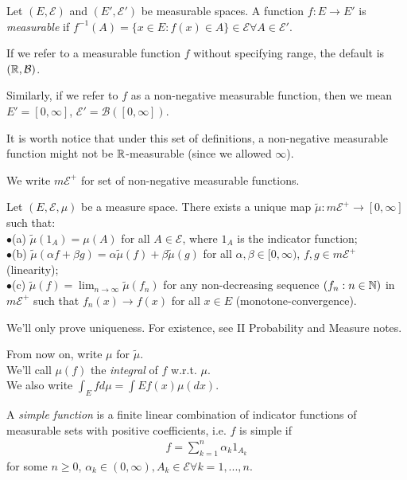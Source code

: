 \documentclass[a4paper]{article}
\begin{document}
Let $(E,\mathcal{E})$ and $(E',\mathcal{E}')$ be measurable spaces. A function $f:E \to E'$ is \emph{measurable} if $f^{-1}(A) = \{x \in E: f(x) \in A\} \in \mathcal{E} \forall A \in \mathcal{E}'$.

If we refer to a measurable function $f$ without specifying range, the default is $(\mathbb{R},\mathcal{B})$.

Similarly, if we refer to $f$ as a non-negative measurable function, then we mean $E'=[0,\infty]$, $\mathcal{E}' = \mathcal{B}([0,\infty])$.

It is worth notice that under this set of definitions, a non-negative measurable function might not be $\mathbb{R}$-measurable (since we allowed $\infty$).

We write $m\mathcal{E}^+$ for set of non-negative measurable functions.

\begin{thm}
Let $(E,\mathcal{E},\mu)$ be a measure space. There exists a unique map $\tilde{\mu}: m\mathcal{E}^+ \to [0,\infty]$ such that:\\
$\bullet$(a) $\tilde{\mu}(1_A) = \mu(A)$ for all $A \in \mathcal{E}$, where $1_A$ is the indicator function;\\
$\bullet$(b) $\tilde{\mu}(\alpha f + \beta g) = \alpha\tilde{\mu}(f) + \beta\tilde{\mu}(g)$ for all $\alpha,\beta \in [0,\infty)$, $f,g \in m\mathcal{E}^+$ (linearity);\\
$\bullet$(c) $\tilde{\mu}(f) = \lim_{n \to \infty} \tilde{\mu}(f_n)$ for any non-decreasing sequence $(f_n:n \in \mathbb{N})$ in $m\mathcal{E}^+$ such that $f_n(x) \to f(x)$ for all $x \in E$ (monotone-convergence).

We'll only prove uniqueness. For existence, see II Probability and Measure notes.
\end{thm}

From now on, write $\mu$ for $\tilde{\mu}$.\\
We'll call $\mu(f)$ the \emph{integral} of $f$ w.r.t. $\mu$.\\
We also write $\int_E f d\mu = \int E f(x) \mu(dx)$.

A \emph{simple function} is a finite linear combination of indicator functions of measurable sets with positive coefficients, i.e. $f$ is simple if 
\begin{equation*}
\begin{aligned}
f =\sum_{k=1}^n \alpha_k 1_{A_k}
\end{aligned}
\end{equation*}
for some $n \geq 0$, $\alpha_k \in (0,\infty), A_k \in \mathcal{E} \forall k = 1,...,n$.
\end{document}
